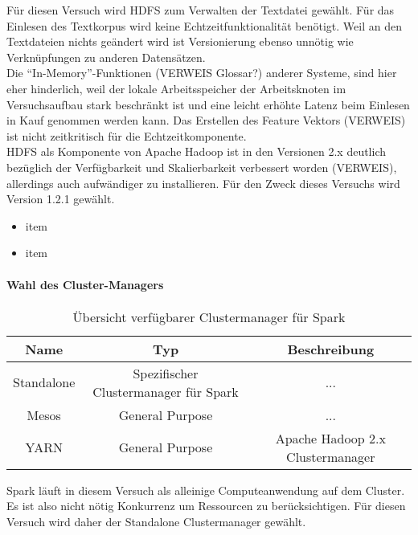Für diesen Versuch wird HDFS zum Verwalten der Textdatei gewählt. Für das Einlesen des Textkorpus wird keine Echtzeitfunktionalität benötigt. Weil an den Textdateien nichts geändert wird ist Versionierung ebenso unnötig wie Verknüpfungen zu anderen Datensätzen.\\

Die "`In-Memory"'-Funktionen (VERWEIS Glossar?) anderer Systeme, sind hier eher hinderlich, weil der lokale Arbeitsspeicher der Arbeitsknoten im Versuchsaufbau stark beschränkt ist und eine leicht erhöhte Latenz beim Einlesen in Kauf genommen werden kann. Das Erstellen des Feature Vektors (VERWEIS) ist nicht zeitkritisch für die Echtzeitkomponente.\\

HDFS als Komponente von Apache Hadoop ist in den Versionen 2.x deutlich bezüglich der Verfügbarkeit und Skalierbarkeit verbessert worden (VERWEIS), allerdings auch aufwändiger zu installieren. Für den Zweck dieses Versuchs wird Version 1.2.1 gewählt.

\begin{itemize}
	\item item 
	\item item
\end{itemize}

\paragraph{Wahl des Cluster-Managers}

\begin{table}[ht]
	\caption{Übersicht verfügbarer Clustermanager für Spark} %
	\centering %
	\begin{tabular}{c c c} %
	\hline\hline %
	Name & Typ & Beschreibung\\ [0.5ex] %
	\hline %
	Standalone & Spezifischer Clustermanager für Spark & ...\\ %
	Mesos & General Purpose & ...\\
	YARN & General Purpose & Apache Hadoop 2.x Clustermanager \\
	\hline %
	\end{tabular}
	\label{table:cmngrs} %
\end{table}

Spark läuft in diesem Versuch als alleinige Computeanwendung auf dem Cluster. Es ist also nicht nötig Konkurrenz um Ressourcen zu berücksichtigen. Für diesen Versuch wird daher der Standalone Clustermanager gewählt.\\

